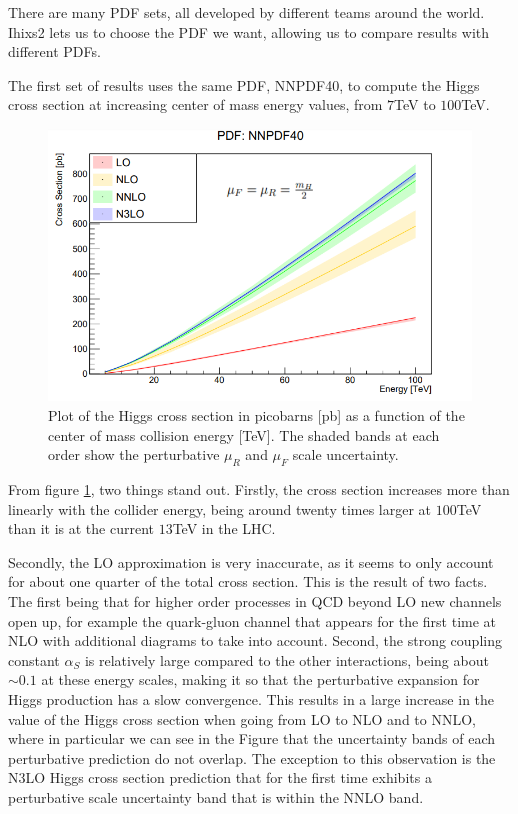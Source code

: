 \documentclass[EPJ,twocolumn]{webofc}
\begin{document}
There are many PDF sets, all developed by different teams around the world. Ihixs2 lets us to choose the PDF we want, allowing us to compare results with different PDFs.

The first set of results uses the same PDF, NNPDF40, to compute the Higgs cross section at increasing center of mass energy values, from $7$TeV to $100$TeV. 

\begin{figure}[ht]
    \centering
    \includegraphics[width=.8\columnwidth]{Images/NNPDFXS.png}
    \caption{ Plot of the Higgs cross section in picobarns [pb] as a function of the center of mass collision energy [TeV]. The shaded bands at each order show the perturbative $\mu_R$ and $\mu_F$ scale uncertainty. }
    \label{results1}
\end{figure}
From figure \ref{results1}, two things stand out. Firstly, the cross section increases more than linearly with the collider energy, being around twenty times larger at $100$TeV than it is at the current $13$TeV in the LHC.

Secondly, the LO approximation is very inaccurate, as it seems to only account for about one quarter of the total cross section. This is the result of two facts. The first being that for higher order processes in QCD beyond LO new channels open up, for example the quark-gluon channel that appears for the first time at NLO with additional diagrams to take into account. Second, the strong coupling constant $\alpha_S$ is relatively large compared to the other interactions, being about $\sim0.1$ at these energy scales, making it so that the perturbative expansion for Higgs production has a slow convergence. This results in a large increase in the value of the Higgs cross section when going from LO to NLO and to NNLO, where in particular we can see in the Figure that the uncertainty bands of each perturbative prediction do not overlap. The exception to this observation is the N3LO Higgs cross section prediction that for the first time exhibits a perturbative scale uncertainty band that is within the NNLO band.
\end{document}
